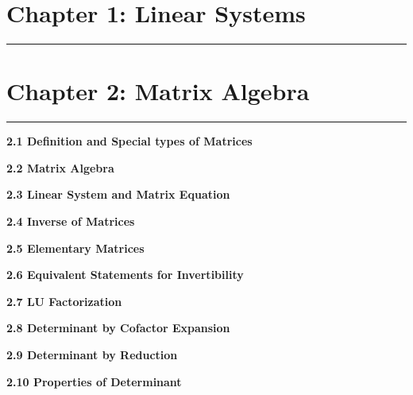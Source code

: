 \documentclass[11pt]{article}
\begin{document}
\newcommand{\defn}[1]{%
\begin{definitionBox}{}{}
#1
\end{definitionBox}%
\vspace{0.1cm}
}
\newcommand{\thm}[1]{%
\begin{theoremBox}{}{} 
#1
\end{theoremBox}%
\vspace{0.1cm}
}
\newcommand{\corr}[1]{%
\begin{corollaryBox}{}{}
#1
\end{corollaryBox}%
\vspace{0.1cm}
}
\newcommand{\algo}[2]{%
\begin{algorithmBox}{#1}{}
#2
\end{algorithmBox}%
\vspace{0.1cm}
}
\newcommand{\props}[2]{%
\begin{propertiesBox}{#1}{}
#2
\end{propertiesBox}%
\vspace{0.1cm}
}
\newcommand{\sectiontitle}[1]{%
\begin{flushleft}\large{\textbf{#1}}\end{flushleft}} 
\newcommand{\chapter}[1]{%
\newpage
\section*{#1}
\hrule
\vspace{0.3cm}
}


\chapter{Chapter 1: Linear Systems}

\chapter{Chapter 2: Matrix Algebra}

\sectiontitle{2.1 Definition and Special types of Matrices}
\sectiontitle{2.2 Matrix Algebra}
\sectiontitle{2.3 Linear System and Matrix Equation}
\sectiontitle{2.4 Inverse of Matrices}
\sectiontitle{2.5 Elementary Matrices}
\sectiontitle{2.6 Equivalent Statements for Invertibility}
\sectiontitle{2.7 LU Factorization}
\sectiontitle{2.8 Determinant by Cofactor Expansion}
\sectiontitle{2.9 Determinant by Reduction}
\sectiontitle{2.10 Properties of Determinant}
\end{document}

